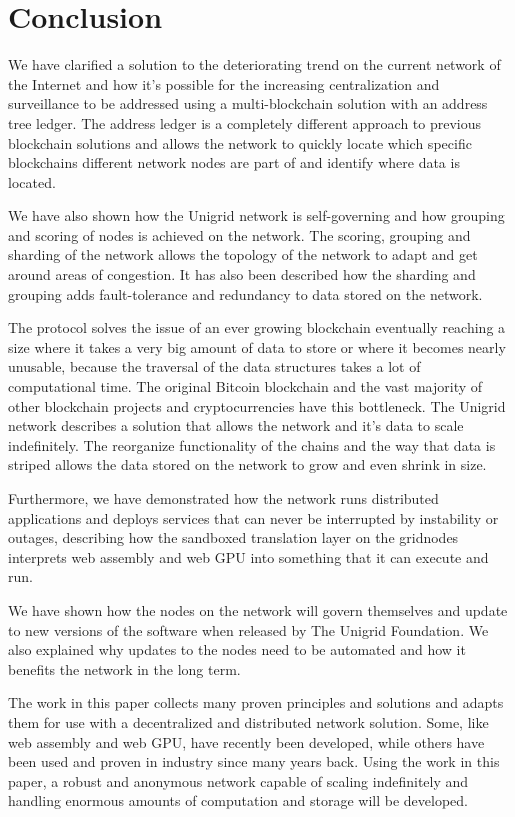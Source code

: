 \documentclass[10pt,a4paper,final]{article}
\begin{document}
\section{Conclusion}
We have clarified a solution to the deteriorating trend on the current network of the Internet and how it's possible for the increasing centralization and surveillance to be addressed using a multi-blockchain solution with an address tree ledger. The address ledger is a completely different approach to previous blockchain solutions and allows the network to quickly locate which specific blockchains different network nodes are part of and identify where data is located.

We have also shown how the Unigrid network is self-governing and how grouping and scoring of nodes is achieved on the network. The scoring, grouping and sharding of the network allows the topology of the network to adapt and get around areas of congestion. It has also been described how the sharding and grouping adds fault-tolerance and redundancy to data stored on the network.

The protocol solves the issue of an ever growing blockchain eventually reaching a size where it takes a very big amount of data to store or where it becomes nearly unusable, because the traversal of the data structures takes a lot of computational time. The original Bitcoin blockchain and the vast majority of other blockchain projects and cryptocurrencies have this bottleneck. The Unigrid network describes a solution that allows the network and it's data to scale indefinitely. The reorganize functionality of the chains and the way that data is striped allows the data stored on the network to grow and even shrink in size.

Furthermore, we have demonstrated how the network runs distributed applications and deploys services that can never be interrupted by instability or outages, describing how the sandboxed translation layer on the \glspl{gridnode} interprets web assembly and web GPU into something that it can execute and run.

We have shown how the nodes on the network will govern themselves and update to new versions of the software when released by The Unigrid Foundation. We also explained why updates to the nodes need to be automated and how it benefits the network in the long term.

The work in this paper collects many proven principles and solutions and adapts them for use with a decentralized and distributed network solution. Some, like web assembly and web GPU, have recently been developed, while others have been used and proven in industry since many years back. Using the work in this paper, a robust and anonymous network capable of scaling indefinitely and handling enormous amounts of computation and storage will be developed.
\end{document}
